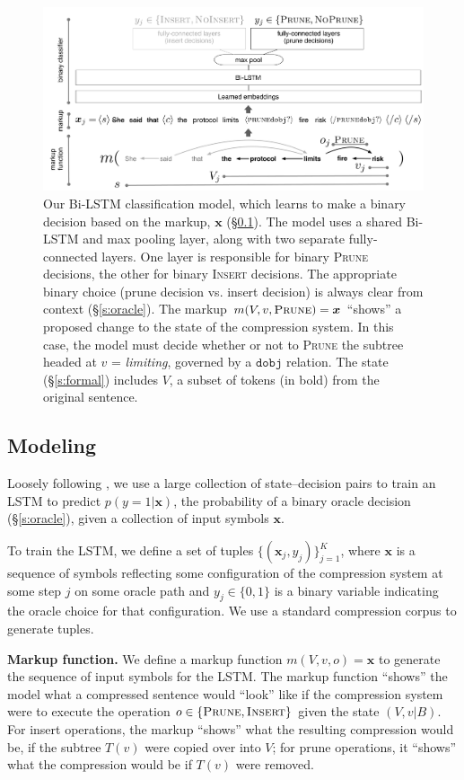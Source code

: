 \documentclass[11pt,a4paper]{article}
\begin{document}
\begin{figure}[htb!]
\centering
\includegraphics[width=.75\textwidth]{example.pdf}
\caption{Our Bi-LSTM classification model, which learns to make a binary decision based on the markup, $\bm{x}$ (\S\ref{s:modeling}). The model uses a shared Bi-LSTM and max pooling layer, along with two separate fully-connected layers. One layer is responsible for binary \textsc{Prune} decisions, the other for binary \textsc{Insert} decisions. The appropriate binary choice (prune decision vs. insert decision) is always clear from context (\S\ref{s:oracle}). The markup $m(V,v,\textsc{Prune})=\bm{x}$ ``shows'' a proposed change to the state of the compression system.  In this case, the model must decide whether or not to \textsc{Prune} the subtree headed at $v$ = \textit{limiting}, governed by a $\texttt{dobj}$ relation. The state (\S\ref{s:formal}) includes $V$, a subset of tokens (in bold) from the original sentence.}
\label{f:example}
\end{figure}

\subsection{Modeling}\label{s:modeling}

Loosely following \citet{D14-1082}, we use a large collection of state--decision pairs to train an LSTM to predict $p(y=1 | \bm{x})$, the probability of a binary oracle decision (\S\ref{s:oracle}), given a collection of input symbols $\bm{x}$.

To train the LSTM, we define a set of tuples $\{(\bm{x}_j, y_j) \}_{j=1}^{K}$, where $\bm{x}$ is a sequence of symbols reflecting some configuration of the compression system at some step $j$ on some oracle path and $y_j \in \{0,1\}$ is a binary variable indicating the oracle choice for that configuration. We use a standard compression corpus \cite{filippova2013overcoming} to generate tuples. 

\textbf{Markup function.} We define a markup function $m(V,v,o)=\bm{x}$ to generate the sequence of input symbols for the LSTM. The markup function ``shows'' the model what a compressed sentence would ``look'' like if the compression system were to execute the operation $o \in \{\textsc{Prune}, \textsc{Insert}\}$ given the state $(V, v|B)$. For insert operations, the markup ``shows'' what the resulting compression would be, if the subtree $T(v)$ were copied over into $V$; for prune operations, it ``shows'' what the compression would be if $T(v)$ were removed.
\end{document}

